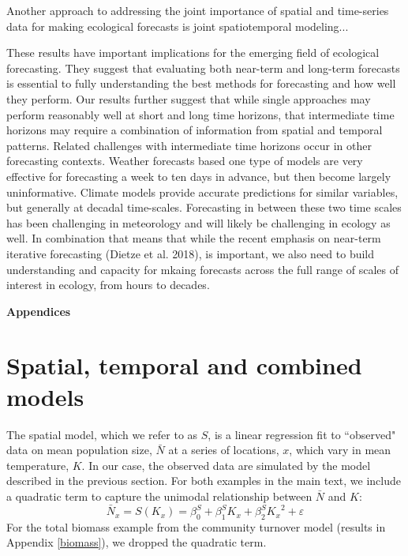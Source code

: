 \documentclass[11pt]{article}
\begin{document}
Another approach to addressing the joint importance of spatial and time-series data for making ecological forecasts is joint spatiotemporal modeling...

These results have important implications for the emerging field of ecological forecasting. They suggest that evaluating both near-term and long-term
forecasts is essential to fully understanding the best methods for forecasting and how well they perform. Our results further suggest that while
single approaches may perform reasonably well at short and long time horizons, that intermediate time horizons may require a combination of information
from spatial and temporal patterns. Related challenges with intermediate time horizons occur in other forecasting contexts. Weather forecasts based one
type of models are very effective for forecasting a week to ten days in advance, but then become largely uninformative. Climate models provide accurate
predictions for similar variables, but generally at decadal time-scales. Forecasting in between these two time scales has been challenging in meteorology
and will likely be challenging in ecology as well. In combination that means that while the recent emphasis on near-term iterative forecasting (Dietze 
et al. 2018), is important, we also need to build understanding and capacity for mkaing forecasts across the full range of scales of interest in
ecology, from hours to decades. 

\newpage
\renewcommand{\refname}{Literature cited}





\clearpage 
\newpage 

\setcounter{page}{1}
\setcounter{equation}{0}
\setcounter{figure}{0}
\setcounter{section}{0}
\setcounter{table}{0}

\centerline{\Large \textbf{Appendices}}

\renewcommand{\thesection}{\Alph{section}}

\section{Spatial, temporal and combined models}\label{models}

The spatial model, which we refer to as $S$, is a linear regression fit to ``observed" data on mean population size, $\bar{N}$ at a series of locations, $x$, which vary in mean temperature, $K$. In our case, the observed data are simulated by the model described in the previous section. For both examples in the main text, we include a quadratic term to capture the unimodal relationship between  $\bar{N}$ and $K$:
 \begin{equation}
 \bar{N}_x = S(K_x) = \beta^S_0 +  \beta^S_1 K_x +\beta^S_2 {K_x}^2 + \varepsilon
 \label{eqn:spatial_regression}
 \end{equation}
For the total biomass example from the community turnover model (results in Appendix \ref{biomass}), we dropped the quadratic term.
\end{document}
